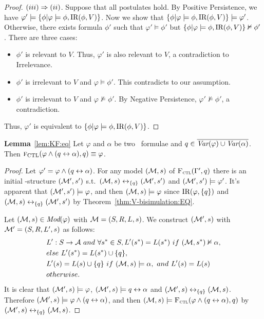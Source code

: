 \documentclass{article}
\begin{document}
\begin{proof}
$(iii)\Rightarrow (ii)$. Suppose that all postulates hold. By Positive Persistence, we have $\varphi' \models \{\phi | \varphi \models \phi, \textrm{IR}(\phi, V)\}$. Now
we show that $\{\phi | \varphi \models \phi, \textrm{IR}(\phi, V)\} \models \varphi'$. Otherwise, there exists formula $\phi'$ such that $\varphi' \models \phi'$ but $\{\phi | \varphi \models \phi, \textrm{IR}(\phi, V)\} \nvDash \phi'$. There are three cases:
\begin{itemize}
  \item $\phi'$ is relevant to $V$. Thus, $\varphi'$ is also relevant to $V$, a contradiction to Irrelevance.
  \item $\phi'$ is irrelevant to $V$ and $\varphi \models \phi'$. This contradicts to our assumption.
  \item $\phi'$ is irrelevant to $V$ and $\varphi \nvDash \phi'$. By Negative Persistence, $\varphi' \nvDash \phi'$, a contradiction.
\end{itemize}
Thus, $\varphi'$ is equivalent to $\{\phi | \varphi \models \phi, \textrm{IR}(\phi, V)\}$.
\end{proof}


  \textbf{Lemma}~\ref{lem:KF:eq} Let $\varphi$ and $\alpha$ be two \CTL\ formulae and $q\in
		\overline{\textit{Var}(\varphi) \cup \textit{Var}(\alpha)}$. Then
	${\textsc{f}_{\textrm{CTL}}}(\varphi \wedge (q\leftrightarrow\alpha), q)\equiv \varphi$.\\
    \begin{proof}
	Let $\varphi' =\varphi \wedge (q\leftrightarrow\alpha)$. For any model $({\cal M},s)$ of ${\textsc{F}_{\textsc{ctl}}}(\Gamma', q)$ there is an initial \MPK-structure $({\cal M}',s')$ s.t.\ $({\cal M},s)\leftrightarrow_{\{q\}}({\cal M}',s')$ and $({\cal M}',s') \models \varphi'$. It's apparent that $({\cal M}',s') \models \varphi$, and then $({\cal M},s) \models \varphi$ since $\textrm{IR}(\varphi,\{q\})$ and $({\cal M},s)\leftrightarrow_{\{q\}}({\cal M}',s')$
	by Theorem~\ref{thm:V-bisimulation:EQ}.

	Let $({\cal M},s) \in \textit{Mod}(\varphi)$ with ${\cal M}=(S, R, L,s)$. We construct $({\cal M}', s)$ with ${\cal M}' = (S, R, L',s)$ as follows:
    \begin{align*}
       & L':S \rto \Ha\ and\ \forall s^*\in S, L'(s^*) = L(s^*)\ if\ (\Hm, s^*) \nvDash \alpha,\\
       & else\ L'(s^*) = L(s^*)\cup\{q\}, \\
       & L'(s) = L(s) \cup\{q\}\ if\ (\Hm, s) \models \alpha,\ and\ L'(s) = L(s)\\
       & otherwise.
    \end{align*}
	It is clear that $({\cal M}',s) \models \varphi$, $({\cal M}',s) \models q\leftrightarrow \alpha$ and
	$({\cal M}', s) \leftrightarrow_{\{q\}} ({\cal M}, s)$. Therefore $({\cal M}', s) \models \varphi \wedge (q\leftrightarrow\alpha)$, and then $({\cal M}, s) \models {\textsc{F}_{\textsc{ctl}}} (\varphi \wedge (q\leftrightarrow\alpha), q)$ by
	$({\cal M}', s) \leftrightarrow_{\{q\}} ({\cal M}, s)$.
\end{proof}
\end{document}
